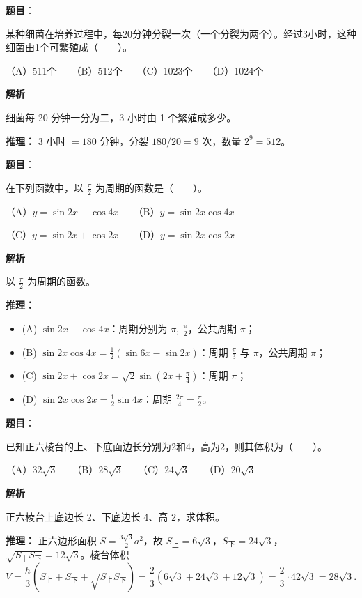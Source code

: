 \begin{answer}

\textbf{题目}：

某种细菌在培养过程中，每20分钟分裂一次（一个分裂为两个）。经过3小时，这种细菌由1个可繁殖成\mbox{（　　）}。

（A）511个　　（B）512个　　（C）1023个　　（D）1024个

\textbf{解析}

细菌每 20 分钟一分为二，3 小时由 1 个繁殖成多少。

\textbf{推理：} 3 小时 $=180$ 分钟，分裂 $180/20=9$ 次，数量 $2^9=512$。


\end{answer}
\begin{answer}

\textbf{题目}：

在下列函数中，以 $\frac\pi2$ 为周期的函数是\mbox{（　　）}。

（A）$y=\sin2x+\cos4x$　　（B）$y=\sin2x\cos4x$

（C）$y=\sin2x+\cos2x$　　（D）$y=\sin2x\cos2x$

\textbf{解析}

以 $\frac\pi2$ 为周期的函数。

\textbf{推理：}
\begin{itemize}
\item (A) $\sin2x+\cos4x$：周期分别为 $\pi,\ \frac\pi2$，公共周期 $\pi$；
\item (B) $\sin2x\cos4x=\frac12\left(\sin6x-\sin2x\right)$：周期 $\frac\pi3$ 与 $\pi$，公共周期 $\pi$；
\item (C) $\sin2x+\cos2x=\sqrt2\sin\left(2x+\frac\pi4\right)$：周期 $\pi$；
\item (D) $\sin2x\cos2x=\frac12\sin4x$：周期 $\frac{2\pi}{4}=\frac\pi2$。
\end{itemize}


\end{answer}
\begin{answer}

\textbf{题目}：

已知正六棱台的上、下底面边长分别为2和4，高为2，则其体积为\mbox{（　　）}。

（A）$32\sqrt3$　　（B）$28\sqrt3$　　（C）$24\sqrt3$　　（D）$20\sqrt3$

\textbf{解析}

正六棱台上底边长 2、下底边长 4、高 2，求体积。

\textbf{推理：} 正六边形面积 $S=\frac{3\sqrt3}{2}a^2$，故 $S_\text{上}=6\sqrt3$，$S_\text{下}=24\sqrt3$，$\sqrt{S_\text{上}S_\text{下}}=12\sqrt3$。棱台体积
\nopagebreak[4]
\[V=\frac h3\left(S_\text{上}+S_\text{下}+\sqrt{S_\text{上}S_\text{下}}\right)=\frac23\left(6\sqrt3+24\sqrt3+12\sqrt3\right)=\frac23\cdot42\sqrt3=28\sqrt3.\]


\end{answer}
